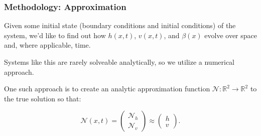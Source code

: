 \begin{frame}
    \frametitle{Methodology: Approximation}

    Given some initial state (boundary conditions and initial conditions) of the system, we'd like to find out how
    $h(x, t)$, $v(x, t)$, and $\beta(x)$ evolve over space and, where applicable, time.

    \bigskip
    \pause
    Systems like this are rarely solveable analytically, so we utilize a numerical approach. 

    \bigskip
    \pause
    One such approach is to create an analytic approximation function $\mathcal{N}: \mathbb{R}^2 \to \mathbb{R}^2$ to the true solution so that:

    $$
    \mathcal{N}(x, t) = \begin{pmatrix*}
        \mathcal{N}_h \\
        \mathcal{N}_v
    \end{pmatrix*} \approx \begin{pmatrix*}
        h \\
        v
    \end{pmatrix*}.
    $$
\end{frame}